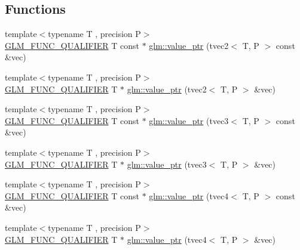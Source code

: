 \subsection*{Functions}
\begin{DoxyCompactItemize}
\item 
{\footnotesize template$<$typename T , precision P$>$ }\\\mbox{\hyperlink{setup_8hpp_a33fdea6f91c5f834105f7415e2a64407}{G\+L\+M\+\_\+\+F\+U\+N\+C\+\_\+\+Q\+U\+A\+L\+I\+F\+I\+ER}} T const  $\ast$ \mbox{\hyperlink{group__gtc__type__ptr_gafb01331238d8899dde700cb9b5dc6ef3}{glm\+::value\+\_\+ptr}} (tvec2$<$ T, P $>$ const \&vec)
\item 
{\footnotesize template$<$typename T , precision P$>$ }\\\mbox{\hyperlink{setup_8hpp_a33fdea6f91c5f834105f7415e2a64407}{G\+L\+M\+\_\+\+F\+U\+N\+C\+\_\+\+Q\+U\+A\+L\+I\+F\+I\+ER}} T $\ast$ \mbox{\hyperlink{group__gtc__type__ptr_gabd3cc713184a2093862605f5f0abb8a4}{glm\+::value\+\_\+ptr}} (tvec2$<$ T, P $>$ \&vec)
\item 
{\footnotesize template$<$typename T , precision P$>$ }\\\mbox{\hyperlink{setup_8hpp_a33fdea6f91c5f834105f7415e2a64407}{G\+L\+M\+\_\+\+F\+U\+N\+C\+\_\+\+Q\+U\+A\+L\+I\+F\+I\+ER}} T const  $\ast$ \mbox{\hyperlink{group__gtc__type__ptr_gac04db5d9c05bd3d50140f34f8695a08c}{glm\+::value\+\_\+ptr}} (tvec3$<$ T, P $>$ const \&vec)
\item 
{\footnotesize template$<$typename T , precision P$>$ }\\\mbox{\hyperlink{setup_8hpp_a33fdea6f91c5f834105f7415e2a64407}{G\+L\+M\+\_\+\+F\+U\+N\+C\+\_\+\+Q\+U\+A\+L\+I\+F\+I\+ER}} T $\ast$ \mbox{\hyperlink{group__gtc__type__ptr_gab2832ef9f1d2571fab5c7ae661e11e75}{glm\+::value\+\_\+ptr}} (tvec3$<$ T, P $>$ \&vec)
\item 
{\footnotesize template$<$typename T , precision P$>$ }\\\mbox{\hyperlink{setup_8hpp_a33fdea6f91c5f834105f7415e2a64407}{G\+L\+M\+\_\+\+F\+U\+N\+C\+\_\+\+Q\+U\+A\+L\+I\+F\+I\+ER}} T const  $\ast$ \mbox{\hyperlink{group__gtc__type__ptr_gaf641bc0e28d4b274826b9afed315d310}{glm\+::value\+\_\+ptr}} (tvec4$<$ T, P $>$ const \&vec)
\item 
{\footnotesize template$<$typename T , precision P$>$ }\\\mbox{\hyperlink{setup_8hpp_a33fdea6f91c5f834105f7415e2a64407}{G\+L\+M\+\_\+\+F\+U\+N\+C\+\_\+\+Q\+U\+A\+L\+I\+F\+I\+ER}} T $\ast$ \mbox{\hyperlink{group__gtc__type__ptr_ga4c19763f3c5991b9dc88a3ffdd9ea6cd}{glm\+::value\+\_\+ptr}} (tvec4$<$ T, P $>$ \&vec)

\end{DoxyCompactItemize}
